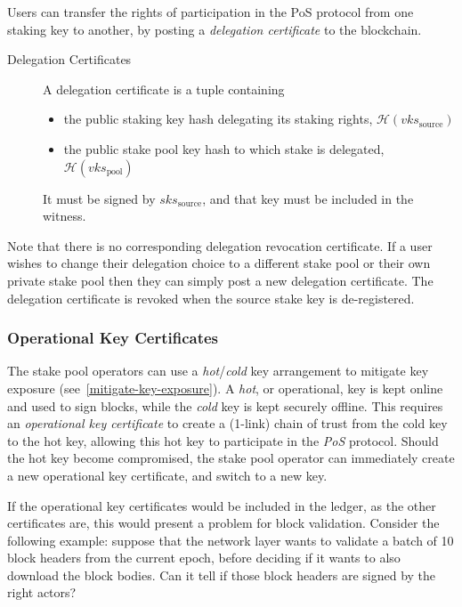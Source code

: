 \documentclass[11pt,a4paper]{article}
\begin{document}
Users can transfer the rights of participation in the PoS protocol from
one staking key to another, by posting a \emph{delegation
certificate} to the blockchain.

\begin{description}
\item[Delegation Certificates]
A delegation certificate is a tuple containing

\begin{itemize}
\item
  the public staking key hash delegating its staking rights,
  \(\mathcal{H}(vks_\text{source})\)
\item
  the public stake pool key hash to which stake is delegated,
  \(\mathcal{H}(vks_\text{pool})\)
\end{itemize}

It must be signed by \(sks_\text{source}\), and that key must be
included in the witness.
\end{description}

Note that there is no corresponding delegation revocation certificate.
If a user wishes to change their delegation choice to a different stake
pool or their own private stake pool then they can simply post a new
delegation certificate. The delegation certificate is revoked when the
source stake key is de-registered.

\subsubsection{Operational Key Certificates}
\label{operational-key-certificates}

The stake pool operators can use a \emph{hot}/\emph{cold} key
arrangement to mitigate key exposure
(see~\cref{mitigate-key-exposure}). A \emph{hot}, or operational, key
is kept online and used to sign blocks, while the \emph{cold} key is
kept securely offline. This requires an \emph{operational key
  certificate} to create a (1-link) chain of trust from the cold key
to the hot key, allowing this hot key to participate in the \emph{PoS}
protocol. Should the hot key become compromised, the stake pool
operator can immediately create a new operational key certificate, and
switch to a new key.

If the operational key certificates would be included in the ledger,
as the other certificates are, this would present a problem for block
validation. Consider the following example: suppose that the network
layer wants to validate a batch of 10 block headers from the current
epoch, before deciding if it wants to also download the block
bodies. Can it tell if those block headers are signed by the right
actors?
\end{document}
